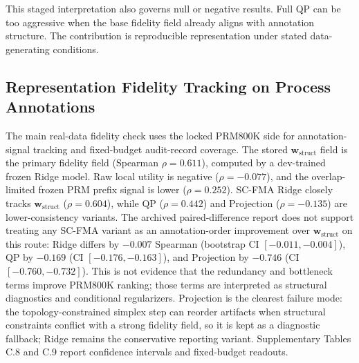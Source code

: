 \documentclass[a4paper,fleqn]{cas-sc}
\newcommand{\wstruct}{\ensuremath{\mathbf{w}_{\mathrm{struct}}}}
\begin{document}
This staged interpretation also governs null or negative results. Full QP can be too aggressive when the base fidelity field already aligns with annotation structure. The contribution is reproducible representation under stated data-generating conditions.

\subsection{Representation Fidelity Tracking on Process Annotations}
\label{sec:prm800k-evidence}

The main real-data fidelity check uses the locked PRM800K side for annotation-signal tracking and fixed-budget audit-record coverage. The stored \wstruct{} field is the primary fidelity field (Spearman $\rho = 0.611$), computed by a dev-trained frozen Ridge model. Raw local utility is negative ($\rho = -0.077$), and the overlap-limited frozen PRM prefix signal is lower ($\rho = 0.252$). SC-FMA Ridge closely tracks \wstruct{} ($\rho = 0.604$), while QP ($\rho = 0.442$) and Projection ($\rho = -0.135$) are lower-consistency variants. The archived paired-difference report does not support treating any SC-FMA variant as an annotation-order improvement over \wstruct{} on this route: Ridge differs by $-0.007$ Spearman (bootstrap CI $[-0.011,-0.004]$), QP by $-0.169$ (CI $[-0.176,-0.163]$), and Projection by $-0.746$ (CI $[-0.760,-0.732]$). This is not evidence that the redundancy and bottleneck terms improve PRM800K ranking; those terms are interpreted as structural diagnostics and conditional regularizers. Projection is the clearest failure mode: the topology-constrained simplex step can reorder artifacts when structural constraints conflict with a strong fidelity field, so it is kept as a diagnostic fallback; Ridge remains the conservative reporting variant. Supplementary Tables C.8 and C.9 report confidence intervals and fixed-budget readouts.
\end{document}

